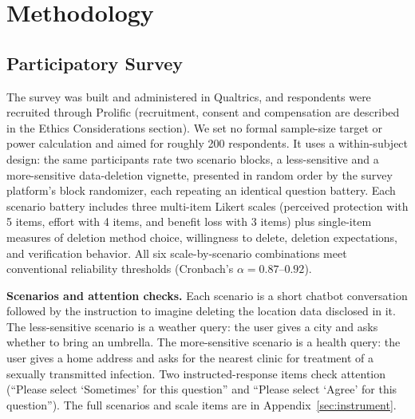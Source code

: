 \documentclass[conference,compsoc]{IEEEtran}
\begin{document}
\section{Methodology}
\label{sec:methodology}

\subsection{Participatory Survey}
\label{sec:survey-methodology}

The survey was built and administered in Qualtrics, and respondents were
recruited through Prolific (recruitment, consent and compensation are
described in the Ethics Considerations section). We set no formal sample-size
target or power calculation and aimed for roughly 200 respondents. It uses a within-subject design: the same participants rate two
scenario blocks, a less-sensitive and a more-sensitive data-deletion vignette,
presented in random order by the survey platform's block randomizer, each
repeating an identical question battery. Each scenario battery includes
three multi-item Likert scales (perceived protection with 5 items, effort
with 4 items, and benefit loss with 3 items) plus single-item measures of
deletion method choice, willingness to delete, deletion expectations, and
verification behavior. All six scale-by-scenario combinations meet
conventional reliability thresholds (Cronbach's $\alpha=0.87$--$0.92$).

\textbf{Scenarios and attention checks.} Each scenario is a short
chatbot conversation followed by the instruction to imagine deleting the
location data disclosed in it. The less-sensitive scenario is a weather
query: the user gives a city and asks whether to bring an umbrella. The
more-sensitive scenario is a health query: the user gives a home address
and asks for the nearest clinic for treatment of a sexually transmitted
infection. Two instructed-response items check attention (``Please select
`Sometimes' for this question'' and ``Please select `Agree' for this
question''). The full scenarios and scale items are in Appendix~\ref{sec:instrument}.
\end{document}
